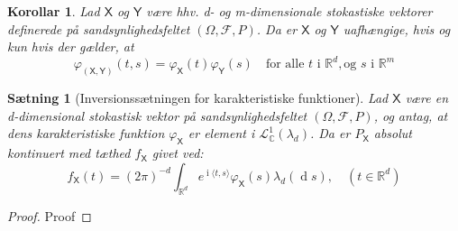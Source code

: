 \documentclass{article}
\newcommand{\R}{\mathbb{R}}
\newcommand{\C}{\mathbb{C}}
\newcommand{\1}{\mathbbm{1}}
\newcommand{\X}{\mathsf{X}}
\newcommand{\Y}{\mathsf{Y}}
\newcommand{\lclass}{\mathcal{L}}
\newcommand{\deriv}{\operatorname{d}}
\newcommand{\icomp}{\operatorname{i}}
\newcommand{\varx}{\varphi_\X}
\newcommand{\pfield}{(\Omega, \mathcal{F}, P)}
\theoremstyle{boxed}
\newtheorem{corollary}[theorem]{Korollar}
\newtheorem{proposition}[theorem]{Sætning}
\begin{document}
\begin{theorem-box}
    \begin{corollary}
        Lad $\X$ og $\Y$ være hhv. d- og m-dimensionale stokastiske vektorer definerede på sandsynlighedsfeltet $\pfield$. Da er $\X$ og $\Y$ uafhængige, hvis og kun hvis der gælder, at $$\varphi_{(\X,\Y)}(t,s)=\varx(t)\varphi_\Y(s)\quad \text{for alle }t\text{ i }\R^d, \text{og }s\text{ i }\R^m$$
    \end{corollary}
\end{theorem-box}
\begin{theorem-box}
    \begin{proposition}[Inversionssætningen for karakteristiske funktioner]
        Lad $\X$ være en d-dimensional stokastisk vektor på sandsynlighedsfeltet $\pfield$, og antag, at dens karakteristiske funktion $\varx$ er element i $\lclass^1_{\C}(\lambda_d)$. Da er $P_\X$ absolut kontinuert med tæthed $f_\X$ givet ved:
        $$f_\X(t)=(2\pi)^{-d}\int_{\R^d}e^{\icomp \langle t,s\rangle}\varx(s)\lambda_d(\deriv s), \quad (t\in\R^d)$$
    \end{proposition}
\end{theorem-box}
\begin{proof}
    Proof
\end{proof}
\end{document}
